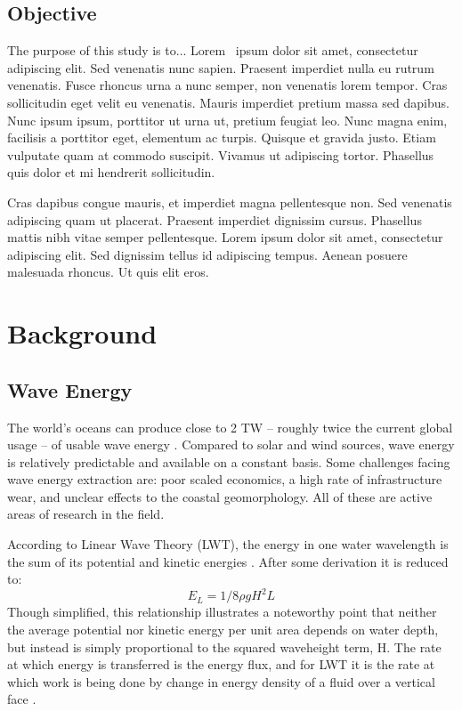 \documentclass[double,12pt]{beavtex}
\begin{document}
\section{Objective}

The purpose of this study is to... Lorem~\cite{petres} ipsum dolor sit amet, consectetur adipiscing elit. Sed venenatis nunc sapien. Praesent imperdiet nulla eu rutrum venenatis. Fusce rhoncus urna a nunc semper, non venenatis lorem tempor. Cras sollicitudin eget velit eu venenatis. Mauris imperdiet pretium massa sed dapibus. Nunc ipsum ipsum, porttitor ut urna ut, pretium feugiat leo. Nunc magna enim, facilisis a porttitor eget, elementum ac turpis. Quisque et gravida justo. Etiam vulputate quam at commodo suscipit. Vivamus ut adipiscing tortor. Phasellus quis dolor et mi hendrerit sollicitudin. 

Cras dapibus congue mauris, et imperdiet magna pellentesque non. Sed venenatis adipiscing quam ut placerat. Praesent imperdiet dignissim cursus. Phasellus mattis nibh vitae semper pellentesque. Lorem ipsum dolor sit amet, consectetur adipiscing elit. Sed dignissim tellus id adipiscing tempus. Aenean posuere malesuada rhoncus. Ut quis elit eros.


\chapter{Background}

\section{Wave Energy}

The world's oceans can produce close to 2 TW -- roughly twice the current global usage -- of usable wave energy \cite{falnes}. Compared to solar and wind sources, wave energy is relatively predictable and available on a constant basis. Some challenges facing wave energy extraction are: poor scaled economics, a high rate of infrastructure wear, and unclear effects to the coastal geomorphology. All of these are active areas of research in the field.

According to Linear Wave Theory (LWT), the energy in one water wavelength is the sum of its potential and kinetic energies \cite{D&D}. After some derivation it is reduced to: 
\begin{equation}
E_L = 1/8 \rho g H^2 L
\end{equation}
Though simplified, this relationship illustrates a noteworthy point that neither the average potential nor kinetic energy per unit area depends on water depth, but instead is simply proportional to the squared waveheight term, H. The rate at which energy is transferred is the energy flux, and for LWT it is the rate at which work is being done by change in energy density of a fluid over a vertical face \cite{D&D}.
\end{document}
